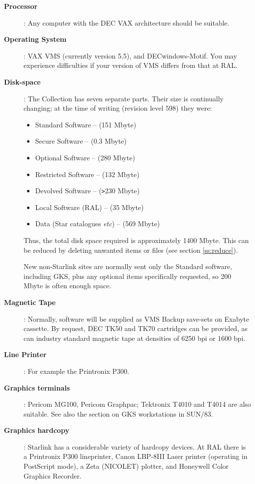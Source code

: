 \begin{description}

\item [\bf Processor]: Any computer with the DEC VAX architecture should be
suitable.

\item [\bf Operating System]: VAX VMS (currently version 5.5), and 
DECwindows-Motif. You may experience difficulties if your version of VMS
differs from that at RAL.

\item [\bf Disk-space]: The Collection has seven separate parts. Their size is
continually changing; at the time of writing (revision level 598) they were:

\begin{itemize}
\item Standard Software -- (151 Mbyte)
\item Secure Software -- (0.3 Mbyte)
\item Optional Software --  (280 Mbyte)
\item Restricted Software -- (132 Mbyte)
\item Devolved Software -- (\verb+>+230 Mbyte)
\item Local Software (RAL) -- (35 Mbyte)
\item Data (Star catalogues {\em etc}) -- (569 Mbyte)
\end{itemize}

Thus, the total disk space required is approximately 1400 Mbyte. This can be
reduced by deleting unwanted items or files (see section \ref{ss:reduce}). 

New non-Starlink sites are normally sent only the Standard software, including
GKS, plus any optional items specifically requested, so 200 Mbyte is often
enough space. 

\item [\bf Magnetic Tape]: Normally, software will be supplied as VMS Backup
save-sets on Exabyte cassette. By request, DEC TK50 and TK70 cartridges can be
provided, as can industry standard magnetic tape at densities of 6250 bpi or
1600 bpi.

\item [\bf Line Printer]: For example the Printronix P300.

\item [\bf Graphics terminals]: Pericom MG100, Pericom Graphpac; Tektronix
T4010 and T4014 are also suitable. See also the section on GKS workstations in
SUN/83.

\item [\bf Graphics hardcopy]: Starlink has a considerable variety of hardcopy
devices. At RAL there is a Printronix P300 lineprinter, Canon LBP-8III Laser
printer (operating in PostScript mode), a Zeta (NICOLET) plotter, and Honeywell
Color Graphics Recorder.


\end{description}
